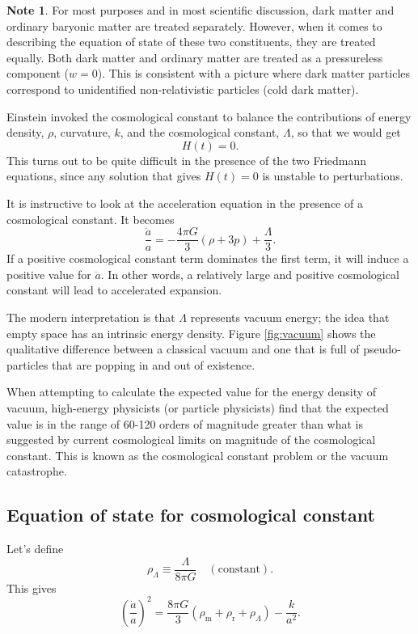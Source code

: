 \documentclass[a4paper,12pt]{article}
\theoremstyle{remark}
\newcommand{\mrm}[1]{\mathrm{#1}}
\renewcommand{\=}[1]{\stackrel{#1}{=}} %
\theoremstyle{plain}
\theoremstyle{definition}
\newtheorem*{definitionT}{Note}%
\newenvironment{note}{
\begin{dBox}
\begin{definitionT}}
{\end{definitionT}
\end{dBox}}
\begin{document}
\begin{note}
For most purposes and in most scientific discussion, dark matter and ordinary baryonic matter are treated separately. However, when it comes to describing the equation of state of these two constituents, they are treated equally. Both dark matter and ordinary matter are treated as a pressureless component ($w=0$). This is consistent with a picture where dark matter particles correspond to unidentified non-relativistic particles (cold dark matter).
\end{note}

Einstein invoked the cosmological constant to balance the contributions of energy density, $\rho$, curvature, $k$, and the cosmological constant, $\Lambda$, so that we would get
\begin{equation}
H(t) = 0.
\end{equation} 
This turns out to be quite difficult in the presence of the two Friedmann equations, since any solution that gives $H(t)=0$ is unstable to perturbations. 

It is instructive to look at the acceleration equation in the presence of a cosmological constant. It becomes
\begin{equation}
\frac{\ddot{a}}{a} = -\frac{4\pi G}{3} \left( \rho + 3p \right) + \frac{\Lambda}{3}.
\end{equation}
If a positive cosmological constant term dominates the first term, it will induce a positive value for $\ddot{a}$. In other words, a relatively large and positive cosmological constant will lead to accelerated expansion. %

The modern interpretation is that $\Lambda$ represents vacuum energy; the idea that empty space has an intrinsic energy density. Figure \ref{fig:vacuum} shows the qualitative difference between a classical vacuum and one that is full of pseudo-particles that are popping in and out of existence. 

When attempting to calculate the expected value for the energy density of vacuum, high-energy physicists (or particle physicists) find that the expected value is in the range of 60-120 orders of magnitude greater than what is suggested by current cosmological limits on magnitude of the cosmological constant. This is known as the cosmological constant problem or the vacuum catastrophe.

\subsection{Equation of state for cosmological constant}
Let's define
\begin{equation}
\rho _\Lambda \equiv \frac{\Lambda}{8\pi G} \quad \mrm{(constant)}.
\end{equation}
This gives
\begin{equation}
\left( \frac{\dot{a}}{a} \right) ^{2} = \frac{8 \pi G}{3} (\rho_\mrm{m} + \rho_\mrm{r} + \rho _\Lambda )- \frac{k}{a^{2}}.
\end{equation}
\end{document}
